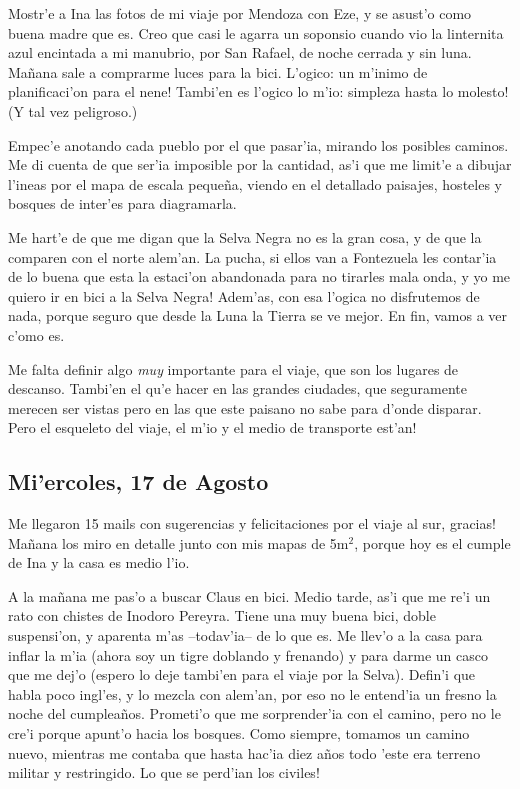 Mostr'e a Ina las fotos de mi viaje por Mendoza con Eze, y se asust'o como buena
madre que es. Creo que casi le agarra un soponsio cuando vio la linternita azul
encintada a mi manubrio, por San Rafael, de noche cerrada y sin luna. Ma\~nana
sale a comprarme luces para la bici. L'ogico: \textexclamdown un m'inimo de
planificaci'on para el nene! Tambi'en es l'ogico lo m'io: \textexclamdown
simpleza hasta lo molesto! (Y tal vez peligroso.)

Empec'e anotando cada pueblo por el que pasar'ia, mirando los posibles caminos.
Me di cuenta de que ser'ia imposible por la cantidad, as'i que me limit'e a
dibujar l'ineas por el mapa de escala peque\~na, viendo en el detallado
paisajes, hosteles y bosques de inter'es para diagramarla.

Me hart'e de que me digan que la Selva Negra no es la gran cosa, y de que la
comparen con el norte alem'an. La pucha, si ellos van a Fontezuela les contar'ia
de lo buena que esta la estaci'on abandonada para no tirarles mala onda,
\textexclamdown y yo me quiero ir en bici a la Selva Negra! Adem'as, con
esa l'ogica no disfrutemos de nada, porque seguro que desde la Luna la Tierra se
ve mejor. En fin, vamos a ver c'omo es.

Me falta definir algo \emph{muy} importante para el viaje, que son los lugares
de descanso. Tambi'en el qu'e hacer en las grandes ciudades, que seguramente
merecen ser vistas pero en las que este paisano no sabe para d'onde disparar.
\textexclamdown Pero el esqueleto del viaje, el m'io y el medio de transporte
est'an!

\subsection*{Mi'ercoles, 17 de Agosto}

Me llegaron 15 mails con sugerencias y felicitaciones por el viaje al sur,
\textexclamdown gracias! Ma\~nana los miro en detalle junto con mis mapas de
5m$^2$, porque hoy es el cumple de Ina y la casa es medio l'io.

A la ma\~nana me pas'o a buscar Claus en bici. Medio tarde, as'i que me re'i un
rato con chistes de Inodoro Pereyra. Tiene una muy buena bici, doble
suspensi'on, y aparenta m'as --todav'ia-- de lo que es. Me llev'o a la casa para
inflar la m'ia (ahora soy un tigre doblando y frenando) y para darme un casco
que me dej'o (espero lo deje tambi'en para el viaje por la Selva). Defin'i que
habla poco ingl'es, y lo mezcla con alem'an, por eso no le entend'ia un fresno
la noche del cumplea\~nos. Prometi'o que me sorprender'ia con el camino, pero no
le cre'i porque apunt'o hacia los bosques. Como siempre, tomamos un camino
nuevo, mientras me contaba que hasta hac'ia diez a\~nos todo 'este era terreno
militar y restringido. \textexclamdown Lo que se perd'ian los civiles!

